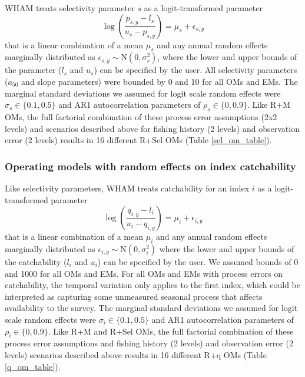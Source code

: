 \documentclass[
  12pt,
]{article}
\begin{document}
WHAM treats selectivity parameter \(s\) as a logit-transformed parameter
\[
\log\left(\frac{p_{s,y}-l_{s}}{u_{s}-p_{s,y}}\right) = \mu_s + \epsilon_{s,y}
\] that is a linear combination of a mean \(\mu_s\) and any annual
random effects marginally distributed as
\(\epsilon_{s,y} \sim \text{N}\left(0,\sigma_s^2\right)\), where the
lower and upper bounds of the parameter (\(l_s\) and \(u_s\)) can be
specified by the user. All selectivity parameters (\(a_{50}\) and slope
parameters) were bounded by 0 and 10 for all OMs and EMs. The marginal
standard deviations we assumed for logit scale random effects were
\(\sigma_s \in \{0.1, 0.5\}\) and AR1 autocorrelation parameters of
\(\rho_s \in \{0,0.9\}\). Like R+M OMs, the full factorial combination
of these process error assumptions (2x2 levels) and scenarios described
above for fishing history (2 levels) and observation error (2 levels)
results in 16 different R+Sel OMs (Table \ref{sel_om_table}).

\hypertarget{operating-models-with-random-effects-on-index-catchability}{%
\subsubsection*{Operating models with random effects on index
catchability}\label{operating-models-with-random-effects-on-index-catchability}}

Like selectivity parameters, WHAM treats catchability for an index \(i\)
as a logit-transformed parameter \[
\log\left(\frac{q_{i,y}-l_{i}}{u_{i}-q_{i,y}}\right) = \mu_i + \epsilon_{i,y}
\] that is a linear combination of a mean \(\mu_i\) and any annual
random effects marginally distributed as
\(\epsilon_{i,y} \sim \text{N}\left(0,\sigma_i^2\right)\) where the
lower and upper bounds of the catchability (\(l_i\) and \(u_i\)) can be
specified by the user. We assumed bounds of 0 and 1000 for all OMs and
EMs. For all OMs and EMs with process errors on catchability, the
temporal variation only applies to the first index, which could be
interpreted as capturing some unmeasured seasonal process that affects
availability to the survey. The marginal standard deviations we assumed
for logit scale random effects were \(\sigma_i \in \{0.1, 0.5\}\) and
AR1 autocorrelation parameters of \(\rho_i \in \{0,0.9\}\). Like R+M and
R+Sel OMs, the full factorial combination of these process error
assumptions and fishing history (2 levels) and observation error (2
levels) scenarios described above results in 16 different R+q OMs (Table
\ref{q_om_table}).
\end{document}
